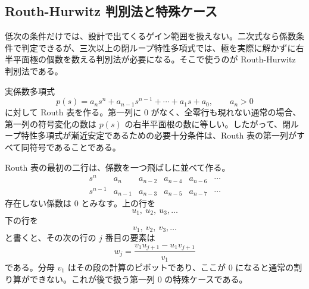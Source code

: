 \subsection{Routh-Hurwitz 判別法と特殊ケース}

低次の条件だけでは、設計で出てくるゲイン範囲を扱えない。二次式なら係数条件で判定できるが、三次以上の閉ループ特性多項式では、極を実際に解かずに右半平面極の個数を数える判別法が必要になる。そこで使うのが Routh-Hurwitz 判別法である。

\begin{theorem}
実係数多項式
\begin{equation}
  p(s)=a_ns^n+a_{n-1}s^{n-1}+\cdots+a_1s+a_0,
  \qquad a_n>0
\end{equation}
に対して Routh 表を作る。第一列に 0 がなく、全零行も現れない通常の場合、第一列の符号変化の数は $p(s)$ の右半平面根の数に等しい。したがって、閉ループ特性多項式が漸近安定であるための必要十分条件は、Routh 表の第一列がすべて同符号であることである。
\end{theorem}

Routh 表の最初の二行は、係数を一つ飛ばしに並べて作る。
\begin{equation}
\begin{array}{c|ccccc}
s^n&a_n&a_{n-2}&a_{n-4}&a_{n-6}&\cdots\\
s^{n-1}&a_{n-1}&a_{n-3}&a_{n-5}&a_{n-7}&\cdots
\end{array}
\end{equation}
存在しない係数は 0 とみなす。上の行を
\begin{equation}
  u_1,\ u_2,\ u_3,\ldots
\end{equation}
下の行を
\begin{equation}
  v_1,\ v_2,\ v_3,\ldots
\end{equation}
と書くと、その次の行の $j$ 番目の要素は
\begin{equation}
  w_j=\frac{v_1u_{j+1}-u_1v_{j+1}}{v_1}
  \label{eq:routh-recursion}
\end{equation}
である。分母 $v_1$ はその段の計算のピボットであり、ここが 0 になると通常の割り算ができない。これが後で扱う第一列 0 の特殊ケースである。

